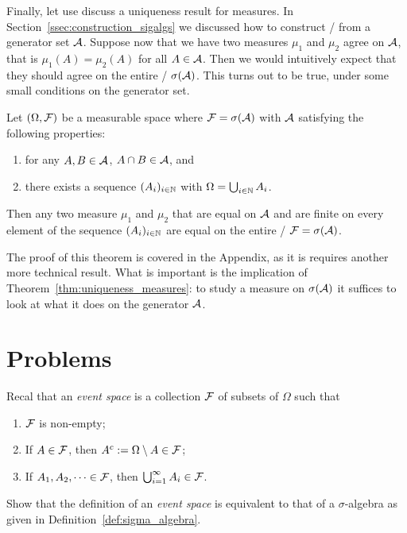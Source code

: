 Finally, let use discuss a uniqueness result for measures. In Section~\ref{ssec:construction_sigalgs} we discussed how to construct \sigalgs/ from a generator set $\mathcal A$. Suppose now that we have two measures $\mu_1$ and $\mu_2$ agree on $\mathcal A$, that is $\mu_1(A) = \mu_2(A)$ for all $A \in \mathcal A$. Then we would intuitively expect that they should agree on the entire \sigalg/ $\sigma(\mathcal A)$. This turns out to be true, under some small conditions on the generator set.

\begin{theorem}\label{thm:uniqueness_measures}
Let $(\Omega ,\mathcal F)$ be a measurable space where $\mathcal F = \sigma(\mathcal A)$ with $\mathcal A$ satisfying the following properties:
\begin{enumerate}
\item for any $A, B \in \mathcal A$, $A \cap B \in \mathcal A$, and
\item there exists a sequence $(A_i)_{i \in \mathbb N}$ with $\Omega = \bigcup_{i \in \mathbb N} A_i$.
\end{enumerate}
Then any two measure $\mu_1$ and $\mu_2$ that are equal on $\mathcal A$ and are finite on every element of the sequence $(A_i)_{i \in \mathbb N}$ are equal on the entire \sigalg/ $\mathcal F = \sigma(\mathcal A)$.
\end{theorem}

The proof of this theorem is covered in the Appendix, as it is requires another more technical result. What is important is the implication of Theorem~\ref{thm:uniqueness_measures}: to study a measure on $\sigma(\mathcal A)$ it suffices to look at what it does on the generator $\mathcal A$.



\section{Problems}

\begin{problem}\label{prb:event_space_are_sigma_algebras}
Recal that an \emph{event space} is a collection $\mathcal F$ of subsets of $\Omega$ such that
\begin{enumerate}
\item $\mathcal F$ is non-empty;
\item If $A \in \mathcal F$, then $A^c := \Omega \setminus A \in \mathcal F$;
\item If $A_1, A_2, \dots \in \mathcal F$, then $\bigcup_{i = 1}^\infty A_i \in \mathcal F$.
\end{enumerate}
Show that the definition of an \emph{event space} is equivalent to that of a $\sigma$-algebra as given in Definition~\ref{def:sigma_algebra}.
\end{problem}

